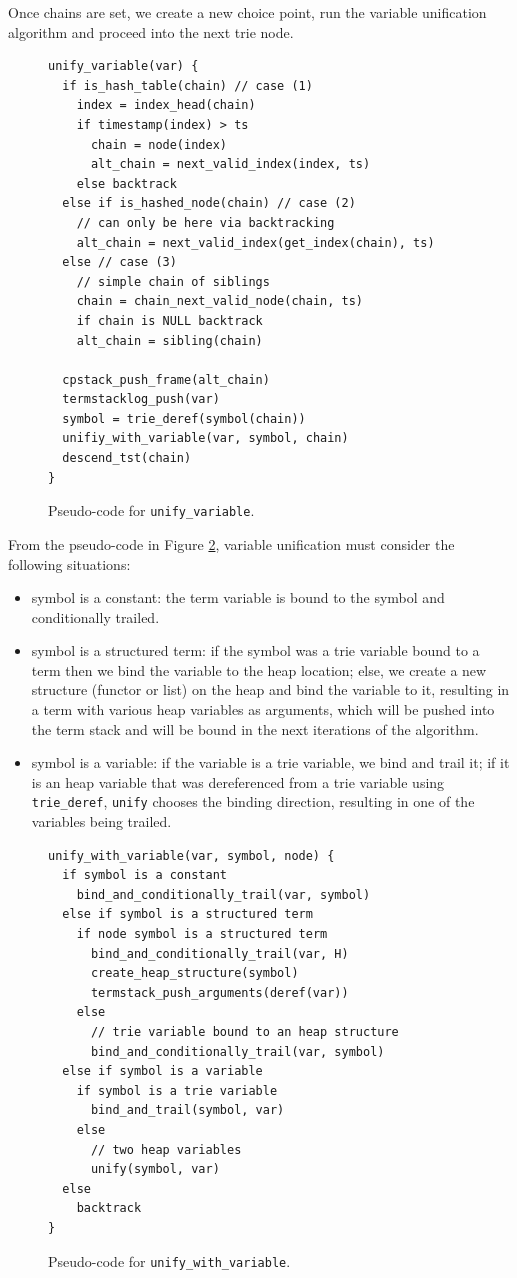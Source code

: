 Once chains are set, we create a new choice point, run the variable unification algorithm
and proceed into the next trie node.

\begin{figure}[ht]
\begin{Verbatim}
unify_variable(var) {
  if is_hash_table(chain) // case (1)
    index = index_head(chain)
    if timestamp(index) > ts
      chain = node(index)
      alt_chain = next_valid_index(index, ts)
    else backtrack
  else if is_hashed_node(chain) // case (2)
    // can only be here via backtracking
    alt_chain = next_valid_index(get_index(chain), ts)
  else // case (3)
    // simple chain of siblings
    chain = chain_next_valid_node(chain, ts)
    if chain is NULL backtrack
    alt_chain = sibling(chain)
  
  cpstack_push_frame(alt_chain)
  termstacklog_push(var)
  symbol = trie_deref(symbol(chain))
  unifiy_with_variable(var, symbol, chain)
  descend_tst(chain)
}
\end{Verbatim}
\caption{Pseudo-code for \texttt{unify\_variable}.}
\label{fig:unify_variable}
\end{figure}

From the pseudo-code in Figure \ref{fig:unify_with_variable}, variable unification
must consider the following situations:

\begin{itemize}
  \item symbol is a constant: the term variable is bound to the symbol and conditionally trailed.
  \item symbol is a structured term: if the symbol was a trie variable bound to a term then we bind the variable to the heap location; else, we create a new structure (functor or list) on the heap and bind the variable to it, resulting in a term with various heap variables as arguments, which will be pushed into the term stack and will be bound in the next iterations of the algorithm.
  \item symbol is a variable: if the variable is a trie variable, we bind and trail it; if it is an heap variable that was dereferenced from a trie variable using \texttt{trie\_deref}, \texttt{unify} chooses the binding direction, resulting in one of the variables being trailed.
\end{itemize}

\begin{figure}[ht]
\begin{Verbatim}
unify_with_variable(var, symbol, node) {
  if symbol is a constant
    bind_and_conditionally_trail(var, symbol)
  else if symbol is a structured term
    if node symbol is a structured term
      bind_and_conditionally_trail(var, H)
      create_heap_structure(symbol)
      termstack_push_arguments(deref(var))
    else
      // trie variable bound to an heap structure
      bind_and_conditionally_trail(var, symbol)
  else if symbol is a variable
    if symbol is a trie variable
      bind_and_trail(symbol, var)
    else
      // two heap variables
      unify(symbol, var)
  else
    backtrack
}
\end{Verbatim}
\caption{Pseudo-code for \texttt{unify\_with\_variable}.}
\label{fig:unify_with_variable}
\end{figure}

